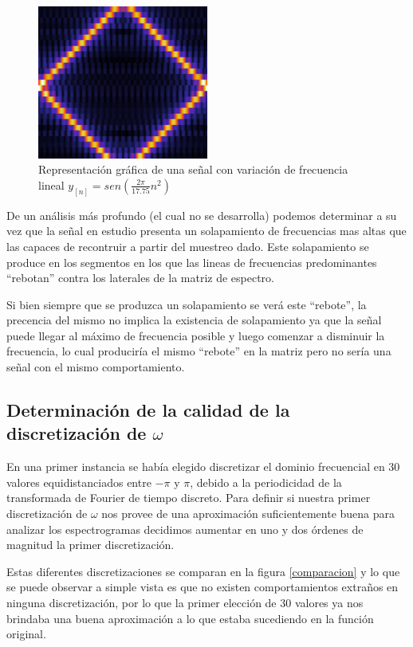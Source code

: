 \documentclass{article}
\begin{document}
	        \begin{figure}[h!]
	            \centering
	            \includegraphics[width=0.5\textwidth]{./Imagenes/Espectrogramas/variable.jpg}
	            \caption{Representación gráfica de una señal con variación de frecuencia lineal $y_{[n]} = sen(\frac{2\pi}{17.75}n^2)$}
	            \label{variable}
	        \end{figure}
	De un análisis más profundo (el cual no se desarrolla) podemos determinar a su vez que la señal en estudio presenta un solapamiento de frecuencias mas altas que las capaces de recontruir a partir del muestreo dado.
	Este solapamiento se produce en los segmentos en los que las lineas de frecuencias predominantes “rebotan” contra los laterales de la matriz de espectro.
	
	Si bien siempre que se produzca un solapamiento se verá este “rebote”, la precencia del mismo no implica la existencia de solapamiento
	 ya que la señal puede llegar al máximo de frecuencia posible y luego comenzar a disminuir la frecuencia, lo cual produciría el mismo “rebote”
	  en la matriz pero no sería una señal con el mismo comportamiento.

\subsection{Determinación de la calidad de la discretización de $\omega$}
En una primer instancia se había elegido discretizar el dominio frecuencial en 30 valores equidistanciados entre $-\pi$ y $\pi$, debido a la periodicidad de la transformada de Fourier de tiempo discreto.
Para definir si nuestra primer discretización de $\omega$ nos provee de una aproximación suficientemente buena para analizar los espectrogramas decidimos aumentar en uno y dos órdenes de magnitud la primer discretización.

Estas diferentes discretizaciones se comparan en la figura \ref{comparacion} y lo que se puede observar a simple vista es que no existen comportamientos extraños en ninguna discretización, por lo que la primer
 elección de 30 valores ya nos brindaba una buena aproximación a lo que estaba sucediendo en la función original.
\end{document}
